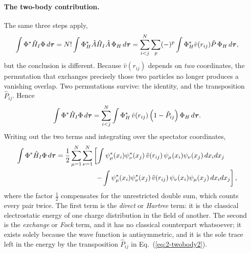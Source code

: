 \paragraph{The two-body contribution.}
The same three steps apply,
\begin{equation}
  \int \Phi^{*}\hat{H}_I\Phi\,d\bm{\tau}
   = N!\int \Phi_H^{*}\hat{A}\hat{H}_I\hat{A}\,\Phi_H\,d\bm{\tau}
   = \sum_{i<j}^{N}\sum_{p}(-)^{p}
     \int \Phi_H^{*}\hat{v}(r_{ij})\hat{P}\,\Phi_H\,d\bm{\tau} ,
  \label{eq:2-twobody1}
\end{equation}
but the conclusion is different.  Because $\hat{v}(r_{ij})$ depends on
\emph{two} coordinates, the permutation that exchanges precisely those two
particles no longer produces a vanishing overlap.  Two permutations survive:
the identity, and the transposition $\hat{P}_{ij}$.  Hence
\begin{equation}
  \int \Phi^{*}\hat{H}_I\Phi\,d\bm{\tau}
   = \sum_{i<j}^{N}\int
     \Phi_H^{*}\,\hat{v}(r_{ij})\left(1-\hat{P}_{ij}\right)\Phi_H\,d\bm{\tau} .
  \label{eq:2-twobody2}
\end{equation}
Writing out the two terms and integrating over the spectator coordinates,
\begin{align}
  \int \Phi^{*}\hat{H}_I\Phi\,d\bm{\tau}
  = \frac{1}{2}\sum_{\mu=1}^{N}\sum_{\nu=1}^{N}
    &\left[\int \psi_{\mu}^{*}(x_i)\psi_{\nu}^{*}(x_j)\,
      \hat{v}(r_{ij})\,\psi_{\mu}(x_i)\psi_{\nu}(x_j)\,dx_idx_j
     \right.\nonumber\\
  &\left.\ -\int \psi_{\mu}^{*}(x_i)\psi_{\nu}^{*}(x_j)\,
      \hat{v}(r_{ij})\,\psi_{\nu}(x_i)\psi_{\mu}(x_j)\,dx_idx_j
    \right],
  \label{H2Expectation}
\end{align}
where the factor $\tfrac12$ compensates for the unrestricted double sum, which
counts every pair twice.  The first term is the \emph{direct} or
\emph{Hartree} term: it is the classical electrostatic energy of one charge
distribution in the field of another.  The second is the \emph{exchange} or
\emph{Fock} term, and it has no classical counterpart whatsoever; it exists
solely because the wave function is antisymmetric, and it is the sole trace
left in the energy by the transposition $\hat{P}_{ij}$ in
Eq.~(\ref{eq:2-twobody2}).

